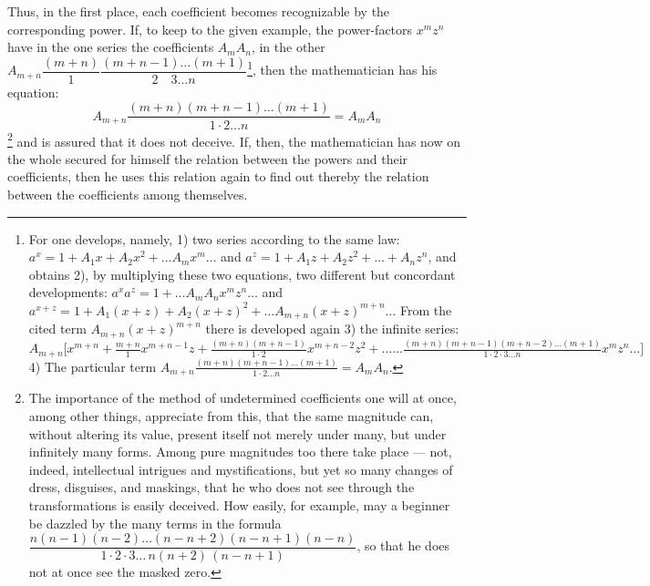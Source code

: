 \documentclass[12pt]{book}
\begin{document}
Thus, in the first place, each coefficient becomes recognizable by the
corresponding power. If, to keep to the given example, the power-factors
$x^{m}z^{n}$ have in the one series the coefficients $A_m A_n$, in the other
$A_{m+n}\dfrac{(m+n)}{1}\dfrac{(m+n-1)\dots(m+1)}{2\quad 3\dots n}$\footnote{For
one develops, namely, 1) two series according to the same law: $a^{x} = 1 + A_1 x +
A_2 x^{2} + \dots A_m x^{m}\dots$ and $a^{z} = 1 + A_1 z + A_2 z^{2} + \dots
+ A_n z^{n}$, and obtains 2), by multiplying these two equations, two different but
concordant developments: $a^{x}a^{z} = 1 + \dots A_m A_n x^{m}z^{n}\dots$ and
$a^{x+z} = 1 + A_1(x+z) + A_2(x+z)^{2} + \dots A_{m+n}(x+z)^{m+n}\dots$ From the
cited term $A_{m+n}(x+z)^{m+n}$ there is developed again 3) the infinite series:
$A_{m+n}\big[x^{m+n} + \frac{m+n}{1}x^{m+n-1}z +
\frac{(m+n)(m+n-1)}{1\cdot 2}x^{m+n-2}z^{2} + \dots\dots
\frac{(m+n)(m+n-1)(m+n-2)\dots(m+1)}{1\cdot 2\cdot 3\dots n}x^{m}z^{n}\dots\big]$
4) The particular term $A_{m+n}\frac{(m+n)(m+n-1)\dots(m+1)}{1\cdot 2\dots n} =
A_m A_n$.}, then the mathematician has his equation:
\[
A_{m+n}\frac{(m+n)(m+n-1)\dots(m+1)}{1\cdot 2\dots n} = A_m A_n
\]\footnote{The importance of the method of undetermined coefficients one will at
once, among other things, appreciate from this, that the same magnitude can,
without altering its value, present itself not merely under many, but under
infinitely many forms. Among pure magnitudes too there take place --- not, indeed,
intellectual intrigues and mystifications, but yet so many changes of dress,
disguises, and maskings, that he who does not see through the transformations is
easily deceived. How easily, for example, may a beginner be dazzled by the many
terms in the formula $\dfrac{n(n-1)(n-2)\dots(n-n+2)(n-n+1)(n-n)}{1\cdot 2\cdot
3\dots\, n(n+2)\,(n-n+1)}$, so that he does not at once see the masked zero.} and is
assured that it does not deceive. If, then, the mathematician has now on the whole
secured for himself the relation between the powers and their coefficients, then he
uses
this relation again to find out thereby the relation between the coefficients among
themselves.
\end{document}

